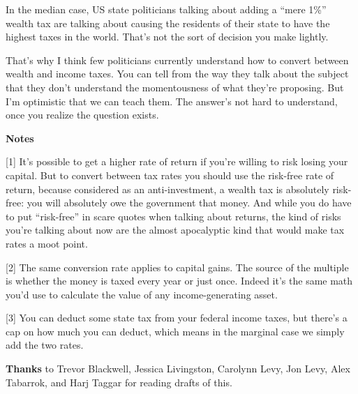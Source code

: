 In the median case, US state politicians talking about adding a ``mere
1\%'' wealth tax are talking about causing the residents of their state
to have the highest taxes in the world. That's not the sort of decision
you make lightly.

That's why I think few politicians currently understand how to convert
between wealth and income taxes. You can tell from the way they talk
about the subject that they don't understand the momentousness of what
they're proposing. But I'm optimistic that we can teach them. The
answer's not hard to understand, once you realize the question exists.

\textbf{Notes}

{[}1{]} It's possible to get a higher rate of return if you're willing
to risk losing your capital. But to convert between tax rates you should
use the risk-free rate of return, because considered as an
anti-investment, a wealth tax is absolutely risk-free: you will
absolutely owe the government that money. And while you do have to put
``risk-free'' in scare quotes when talking about returns, the kind of
risks you're talking about now are the almost apocalyptic kind that
would make tax rates a moot point.

{[}2{]} The same conversion rate applies to capital gains. The source of
the multiple is whether the money is taxed every year or just once.
Indeed it's the same math you'd use to calculate the value of any
income-generating asset.

{[}3{]} You can deduct some state tax from your federal income taxes,
but there's a cap on how much you can deduct, which means in the
marginal case we simply add the two rates.

\textbf{Thanks} to Trevor Blackwell, Jessica Livingston, Carolynn Levy,
Jon Levy, Alex Tabarrok, and Harj Taggar for reading drafts of this.
